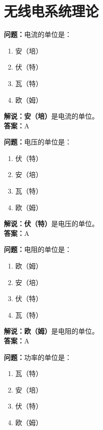 \chapter{无线电系统理论}


\textbf{问题：}电流的单位是：

\begin{enumerate}[label=\Alph*), leftmargin=1cm]
	\item 安（培）
	\item 伏（特）
	\item 瓦（特）
	\item 欧（姆）
\end{enumerate}

\textbf{解说：}\textbf{安（培）}是电流的单位。\\\textbf{答案：}A



\textbf{问题：}电压的单位是：

\begin{enumerate}[label=\Alph*), leftmargin=1cm]
	\item 伏（特）
	\item 安（培）
	\item 瓦（特）
	\item 欧（姆）
\end{enumerate}

\textbf{解说：伏（特）}是电压的单位。\\\textbf{答案：}A



\textbf{问题：}电阻的单位是：

\begin{enumerate}[label=\Alph*), leftmargin=1cm]
	\item 欧（姆）
	\item 安（培）
	\item 伏（特）
	\item 瓦（特）
\end{enumerate}

\textbf{解说：欧（姆）}是电阻的单位。\\\textbf{答案：}A



\textbf{问题：}功率的单位是：

\begin{enumerate}[label=\Alph*), leftmargin=1cm]
	\item 瓦（特）
	\item 安（培）
	\item 伏（特）
	\item 欧（姆）
\end{enumerate}

